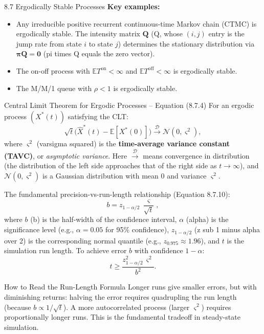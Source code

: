 \documentclass[aspectratio=169,10pt]{beamer}
\newcommand{\E}{\mathbb{E}}
\begin{document}
\begin{frame}[allowframebreaks]{8.7 Ergodically Stable Processes}
\textbf{Key examples:}
\begin{itemize}
  \item Any irreducible positive recurrent continuous-time Markov chain (CTMC)
        is ergodically stable.  The intensity matrix $\mathbf{Q}$ (Q, whose
        $(i,j)$ entry is the jump rate from state $i$ to state $j$) determines
        the stationary distribution via $\boldsymbol{\pi}\mathbf{Q} = \mathbf{0}$
        (pi times Q equals the zero vector).
  \item The on-off process with $\E T^{\mathrm{on}} < \infty$ and
        $\E T^{\mathrm{off}} < \infty$ is ergodically stable.
  \item The M/M/1 queue with $\rho < 1$ is ergodically stable.
\end{itemize}

\framebreak

\begin{block}{Central Limit Theorem for Ergodic Processes -- Equation (8.7.4)}
For an ergodic process $(X^*(t))$ satisfying the CLT:
\[
  \sqrt{t}\bigl(\hat{X}^*(t) - \E[X^*(0)]\bigr) \xrightarrow{\mathcal{D}}
  \mathcal{N}(0, \varsigma^2),
\]
where $\varsigma^2$ (varsigma squared) is the \textbf{time-average variance
constant (TAVC)}, or \emph{asymptotic variance}.  Here $\xrightarrow{\mathcal{D}}$
means convergence in distribution (the distribution of the left side approaches
that of the right side as $t \to \infty$), and $\mathcal{N}(0, \varsigma^2)$ is
a Gaussian distribution with mean 0 and variance $\varsigma^2$.
\end{block}

The fundamental precision-vs-run-length relationship (Equation 8.7.10):
\[
  b = z_{1-\alpha/2}\,\frac{\varsigma}{\sqrt{t}},
\]
where $b$ (b) is the half-width of the confidence interval, $\alpha$ (alpha) is
the significance level (e.g., $\alpha=0.05$ for 95\% confidence),
$z_{1-\alpha/2}$ (z sub 1 minus alpha over 2) is the corresponding normal quantile
(e.g., $z_{0.975} \approx 1.96$), and $t$ is the simulation run length.
To achieve error $b$ with confidence $1-\alpha$:
\[
  t \ge \frac{z_{1-\alpha/2}^2\,\varsigma^2}{b^2}.
\]

\begin{alertblock}{How to Read the Run-Length Formula}
Longer runs give smaller errors, but with diminishing returns: halving the error
requires quadrupling the run length (because $b \propto 1/\sqrt{t}$).  A more
autocorrelated process (larger $\varsigma^2$) requires proportionally longer
runs.  This is the fundamental tradeoff in steady-state simulation.
\end{alertblock}

\end{frame}
\end{document}

